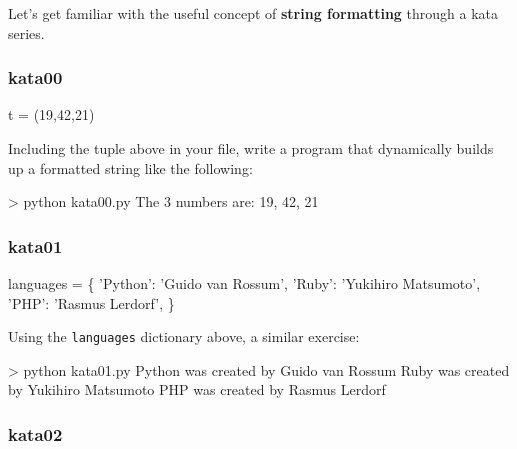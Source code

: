 \documentclass[]{article}
\newenvironment{Shaded}{\begin{snugshade}}{\end{snugshade}}
\newcommand{\NormalTok}[1]{\textcolor[rgb]{0.81,0.81,0.76}{#1}}
\begin{document}
Let's get familiar with the useful concept of \textbf{string formatting}
through a kata series.

\hypertarget{kata00}{%
\subsubsection{kata00}\label{kata00}}

\begin{Shaded}
\begin{Highlighting}[]
\NormalTok{t = (19,42,21)}
\end{Highlighting}
\end{Shaded}

Including the tuple above in your file, write a program that dynamically
builds up a formatted string like the following:

\begin{Shaded}
\begin{Highlighting}[]
\NormalTok{> python kata00.py}
\NormalTok{The 3 numbers are: 19, 42, 21}
\end{Highlighting}
\end{Shaded}

\hypertarget{kata01}{%
\subsubsection{kata01}\label{kata01}}

\begin{Shaded}
\begin{Highlighting}[]
\NormalTok{languages = \{}
\NormalTok{    'Python': 'Guido van Rossum',}
\NormalTok{    'Ruby': 'Yukihiro Matsumoto',}
\NormalTok{    'PHP': 'Rasmus Lerdorf',}
\NormalTok{    \}}
\end{Highlighting}
\end{Shaded}

Using the \texttt{languages} dictionary above, a similar exercise:

\begin{Shaded}
\begin{Highlighting}[]
\NormalTok{> python kata01.py}
\NormalTok{Python was created by Guido van Rossum}
\NormalTok{Ruby was created by Yukihiro Matsumoto}
\NormalTok{PHP was created by Rasmus Lerdorf}
\end{Highlighting}
\end{Shaded}

\hypertarget{kata02}{%
\subsubsection{kata02}\label{kata02}}
\end{document}
